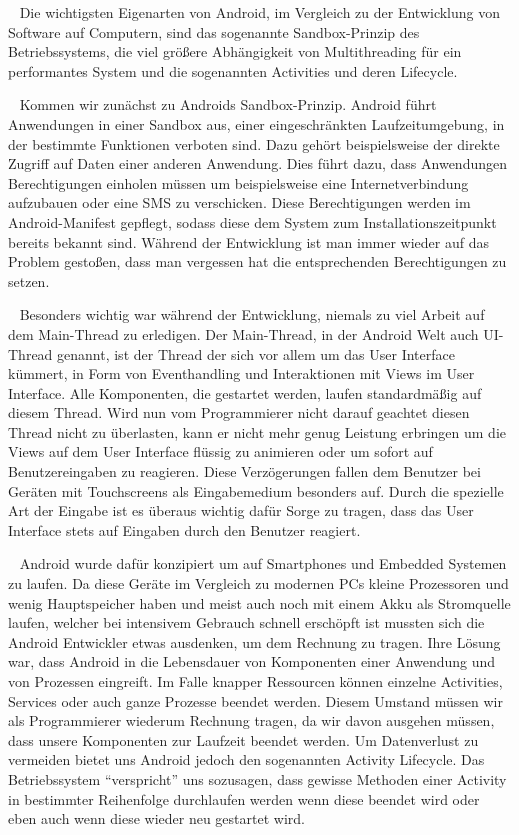 \documentclass{scrartcl}
\begin{document}
\ \newline
Die wichtigsten Eigenarten von Android, im Vergleich zu der Entwicklung von
Software auf Computern, sind das sogenannte Sandbox-Prinzip des Betriebssystems,
die viel größere Abhängigkeit von Multithreading für ein performantes System und
die sogenannten Activities und deren Lifecycle.

\ \newline
Kommen wir zunächst zu Androids Sandbox-Prinzip. Android führt Anwendungen in
einer Sandbox aus, einer eingeschränkten Laufzeitumgebung, in der bestimmte
Funktionen verboten sind. Dazu gehört beispielsweise der direkte Zugriff auf
Daten einer anderen Anwendung. Dies führt dazu, dass Anwendungen Berechtigungen
einholen müssen um beispielsweise eine Internetverbindung aufzubauen oder eine
SMS zu verschicken. Diese Berechtigungen werden im Android-Manifest gepflegt,
sodass diese dem System zum Installationszeitpunkt bereits bekannt sind. Während
der Entwicklung ist man immer wieder auf das Problem gestoßen, dass man
vergessen hat die entsprechenden Berechtigungen zu setzen.

\ \newline
Besonders wichtig war während der Entwicklung, niemals zu viel Arbeit auf dem
Main-Thread zu erledigen. Der Main-Thread, in der Android Welt auch UI-Thread
genannt, ist der Thread der sich vor allem um das User Interface kümmert, in Form
von Eventhandling und Interaktionen mit Views im User Interface. Alle
Komponenten, die gestartet werden, laufen standardmäßig auf diesem Thread. Wird
nun vom Programmierer nicht darauf geachtet diesen Thread nicht zu überlasten,
kann er nicht mehr genug Leistung erbringen um die Views auf dem User Interface
flüssig zu animieren oder um sofort auf Benutzereingaben zu reagieren. Diese
Verzögerungen fallen dem Benutzer bei Geräten mit Touchscreens als Eingabemedium
besonders auf. Durch die spezielle Art der Eingabe ist es überaus wichtig dafür
Sorge zu tragen, dass das User Interface stets auf Eingaben durch den Benutzer
reagiert.

\ \newline
Android wurde dafür konzipiert um auf Smartphones und Embedded Systemen zu
laufen. Da diese Geräte im Vergleich zu modernen PCs kleine Prozessoren und
wenig Hauptspeicher haben und meist auch noch mit einem Akku als Stromquelle
laufen, welcher bei intensivem Gebrauch schnell erschöpft ist mussten sich die
Android Entwickler etwas ausdenken, um dem Rechnung zu tragen. Ihre Lösung war,
dass Android in die Lebensdauer von Komponenten einer Anwendung und von
Prozessen eingreift. Im Falle knapper Ressourcen können einzelne Activities,
Services oder auch ganze Prozesse beendet werden. Diesem Umstand müssen wir als
Programmierer wiederum Rechnung tragen, da wir davon ausgehen müssen, dass
unsere Komponenten zur Laufzeit beendet werden. Um Datenverlust zu vermeiden
bietet uns Android jedoch den sogenannten Activity Lifecycle. Das Betriebssystem
\enquote{verspricht} uns sozusagen, dass gewisse Methoden einer Activity in
bestimmter Reihenfolge durchlaufen werden wenn diese beendet wird oder eben auch
wenn diese wieder neu gestartet wird.
\end{document}
